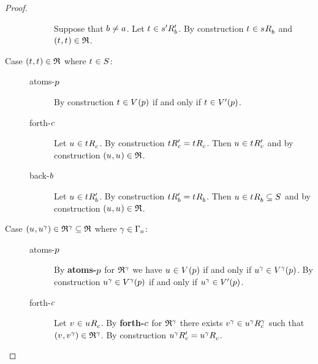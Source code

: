\begin{proof}
\begin{description}
\begin{description}
                Suppose that $\agentB \neq \agentA$.
                Let $\kStateT \in \kSuccessorsPB{\kStateSP}$.
                By construction $\kStateT \in \kSuccessorsB{\kStateS}$ and $(\kStateT, \kStateT) \in \refinement$.
        \end{description}
    \item[Case $(\kStateT, \kStateT) \in \refinement$ where $\kStateT \in \kStates$:]
        \hfill
        \begin{description}
            \item[atoms-$\atomP$] 
                By construction $\kStateT \in \kValuation(\atomP)$ if and only if $\kStateT \in \kValuationP(\atomP)$.
            \item[forth-$\agentC$]
                Let $\kStateU \in \kSuccessorsC{\kStateT}$.
                By construction $\kSuccessorsPC{\kStateT} = \kSuccessorsC{\kStateT}$.
                Then $\kStateU \in \kSuccessorsPC{\kStateT}$ and by construction $(\kStateU, \kStateU) \in \refinement$.
            \item[back-$\agentB$]
                Let $\kStateU \in \kSuccessorsPB{\kStateT}$.
                By construction $\kSuccessorsPB{\kStateT} = \kSuccessorsB{\kStateT}$.
                Then $\kStateU \in \kSuccessorsB{\kStateT} \subseteq \kStates$ and by construction $(\kStateU, \kStateU) \in \refinement$.
        \end{description}
    \item[{Case $(\kStateU, \kStateU[\gamma]) \in \refinement^\gamma \subseteq \refinement$ where $\gamma \in \Gamma_\agentA$:}]
        \hfill
        \begin{description}
            \item[atoms-$\atomP$] 
                By {\bf atoms-$\atomP$} for $\refinement^\gamma$ we have $\kStateU \in \kValuation(\atomP)$ if and only if $\kStateU[\gamma] \in \kValuation[\gamma](\atomP)$.
                By construction $\kStateU[\gamma] \in \kValuation[\gamma](\atomP)$ if and only if $\kStateU[\gamma] \in \kValuationP(\atomP)$.
            \item[forth-$\agentC$]
                Let $\kStateV \in \kSuccessorsC{\kStateU}$.
                By {\bf forth-$\agentC$} for $\refinement^{\gamma}$ there exists $\kStateV[\gamma] \in \kSuccessorsC[\gamma]{\kStateU[\gamma]}$ such that $(\kStateV, \kStateV[\gamma]) \in \refinement^{\gamma}$.
                By construction $\kSuccessorsPC{\kStateU[\gamma]} = \kSuccessorsC{\kStateU[\gamma]}$.


\end{description}
\end{description}
\end{proof}
